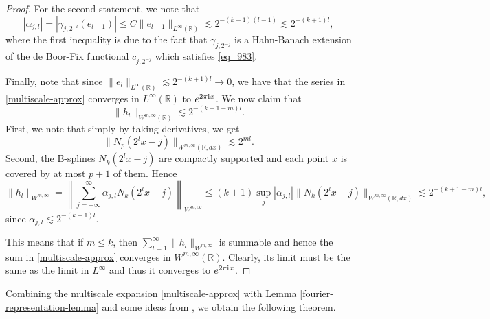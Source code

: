 \begin{proof}
 For the second statement, we note that
 \begin{equation}
  |\alpha_{j,l}| = |\gamma_{j,2^{-l}}(e_{l-1})| \leq C\|e_{l-1}\|_{L^\infty(\mathbb{R})} \lesssim 2^{-(k+1)(l-1)} \lesssim 2^{-(k+1)l},
 \end{equation}
 where the first inequality is due to the fact that $\gamma_{j,2^{-j}}$ is a Hahn-Banach extension of the de Boor-Fix functional $c_{j,2^{-j}}$ which satisfies \eqref{eq_983}.
 
 Finally, note that since $\|e_l\|_{L^\infty(\mathbb{R})} \lesssim 2^{-(k+1)l}\rightarrow 0$, we have that the series in \eqref{multiscale-approx} converges in $L^\infty(\mathbb{R})$ to $e^{2\pi {\mathrm{i}\mkern1mu} x}$. We now claim that
 \begin{equation}
  \|h_l\|_{W^{m,\infty}(\mathbb{R})} \lesssim 2^{-(k+1-m)l}.
 \end{equation}
 First, we note that simply by taking derivatives, we get
 \begin{equation}
  \|N_p(2^lx-j)\|_{W^{m,\infty}(\mathbb{R}, dx)} \lesssim 2^{ml}.
 \end{equation}
 Second, the B-splines $N_k(2^lx-j)$ are compactly supported and each point $x$ is covered by at most $p+1$ of them. Hence
 \begin{equation}
  \|h_l\|_{W^{m,\infty}} = \left\|\sum_{j=-\infty}^\infty \alpha_{j,l}N_k(2^{l}x-j)\right\|_{W^{m,\infty}} \leq (k+1)\sup_{j}|\alpha_{j,l}|\|N_k(2^lx-j)\|_{W^{m,\infty}(\mathbb{R}, dx)} \lesssim 2^{-(k+1-m)l},
 \end{equation}
 since $\alpha_{j,l}\lesssim 2^{-(k+1)l}$.
 
 This means that if $m\leq k$, then $\sum_{l=1}^\infty \|h_l\|_{W^{m,\infty}}$ is summable and hence the sum in \eqref{multiscale-approx} converges in $W^{m,\infty}(\mathbb{R})$. Clearly, its limit must be the same as the limit in $L^\infty$ and thus it converges to $e^{2\pi {\mathrm{i}\mkern1mu} x}$.
\end{proof}

Combining the multiscale expansion \eqref{multiscale-approx} with Lemma \ref{fourier-representation-lemma} and some ideas from \cite{makovoz1996random}, we obtain the following theorem.

